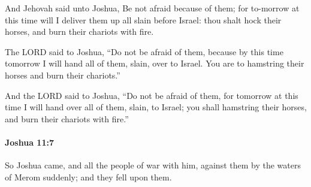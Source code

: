 			\begin{versebox}
					\item[BHS] 
					\item[ASV] And Jehovah said unto Joshua, Be not afraid because of them; for to-morrow at this time will I deliver them up all slain before Israel: thou shalt hock their horses, and burn their chariots with fire.
					\item[NIV] The LORD said to Joshua, “Do not be afraid of them, because by this time tomorrow I will hand all of them, slain, over to Israel. You are to hamstring their horses and burn their chariots.”
					\item[NRSV] And the LORD said to Joshua, “Do not be afraid of them, for tomorrow at this time I will hand over all of them, slain, to Israel; you shall hamstring their horses, and burn their chariots with fire.”
			\end{versebox}

		\paragraph{Joshua 11:7} %
			\label{JOSHUA-11-7}

			So Joshua came, and all the people of war with him, against them by the waters of Merom suddenly; and they fell upon them.

